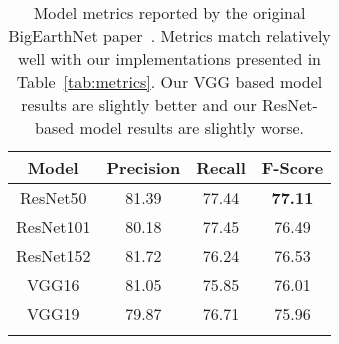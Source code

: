 \documentclass[journal]{IEEEtran}
\begin{document}
\begin{table}[h]
    \centering
    \begin{tabular}{ c c c c}
    \toprule
        Model &  Precision & Recall & F-Score \\
        \hline
        ResNet50 & 81.39 & 77.44 & \textbf{77.11} \\
        \hline
        ResNet101 & 80.18 & 77.45 & 76.49\\
        \hline
        ResNet152 & 81.72& 76.24&76.53\\
        \hline
        VGG16 & 81.05 & 75.85 & 76.01 \\
        \hline
        VGG19 & 79.87 & 76.71 & 75.96\\
        \hline
\bottomrule\\
    \end{tabular}
    \caption{Model metrics reported by the original BigEarthNet paper~\citep{sumbul2020bigearthnet}. Metrics match relatively well with our implementations presented in Table~\ref{tab:metrics}. Our VGG based model results are slightly better and our ResNet-based model results are slightly worse.} 
    \label{tab:BigEarthNetOrig}
\end{table}
\end{document}
